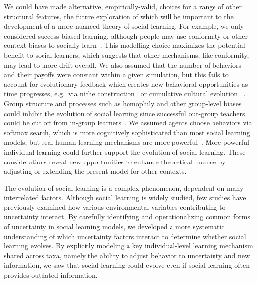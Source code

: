 \documentclass[letterpaper,11.5pt]{scrartcl}
\begin{document}
We could have made alternative, empirically-valid, choices for a range of other structural features, the future exploration of which will be important to the development of a more nuanced theory of social learning.  %
For example, we only considered success-biased
learning, although people may use conformity or other context biases to socially
learn~\citep{BoydRicherson1985,Muthukrishna2016a,Smaldino2018b}.  This modelling
choice maximizes the potential benefit to social learners, which suggests that
other mechanisms, like conformity, may lead to more drift overall. We also assumed that the number of behaviors and
their payoffs were constant within a given simulation, but this fails to account for evolutionary feedback which creates new behavioral opportunities as time progresses, e.g.\ via niche construction~\citep{Smaldino2012a,Heras-Escribano2020} or cumulative cultural evolution
~\citep{Smolla2019,Derex2020}.  Group structure
and processes such as homophily and other group-level biases could inhibit the
evolution of social learning since successful out-group teachers could be cut off from
in-group learners~\citep{Golub2012}. We assumed agents choose behaviors via softmax
search, which is more cognitively sophisticated than most social learning models, but real human learning mechanisms are more powerful~\citep{Schulz2020a,Wu2022}. More powerful individual learning could further
support the evolution of social learning. These considerations reveal new opportunities to enhance theoretical nuance by adjusting or extending the present model for other contexts. 



The evolution of social learning is a complex phenomenon, dependent on many interrelated factors. Although social learning is widely studied, few studies have previously examined how various environmental variables contributing to uncertainty interact. 
By carefully identifying and operationalizing common forms of  uncertainty in social learning models, we developed a more systematic
understanding of which uncertainty factors interact to determine whether social
learning evolves. By explicitly modeling a key individual-level learning mechanism
shared across taxa, namely the ability to adjust behavior to uncertainty and new
information, we saw that social learning could evolve even if social learning
often provides outdated information. 
\end{document}
